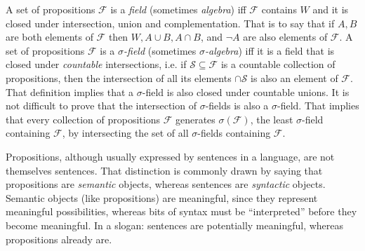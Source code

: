 A set of propositions $\mathcal{F}$ is a {\em field} (sometimes {\em algebra})
iff $\mathcal{F}$ contains $W$ and it is closed under intersection, union and
complementation. That is to say that if $A,B$ are both elements of $\mathcal{F}$
then $W,A\cup B,A\cap B$, and  $\neg A$ are also elements of $\mathcal{F}.$ A
set of propositions $\mathcal{F}$ is a {\em $\sigma$-field} (sometimes {\em
$\sigma$-algebra}) iff it is a field that is closed under {\em countable}
intersections, i.e. if $\mathcal{S}\subseteq \mathcal{F}$ is a countable
collection of propositions, then the intersection of all its elements $\cap
\mathcal{S}$ is also an element of $\mathcal{F}.$ That definition implies that a
$\sigma$-field is also closed under countable unions. It is not difficult to
prove that the intersection of $\sigma$-fields is also a $\sigma$-field. That
implies that every collection of propositions $\mathcal{F}$ generates
$\sigma(\mathcal{F})$, the least $\sigma$-field containing $\mathcal{F}$, by
intersecting the set of all $\sigma$-fields containing $\mathcal{F}$. 

Propositions, although usually expressed by sentences in a language, are not
themselves sentences. That distinction is commonly drawn by saying that
propositions are {\em semantic} objects, whereas sentences are {\em syntactic}
objects. Semantic objects (like propositions) are meaningful, since they
represent meaningful possibilities, whereas bits of syntax must be
``interpreted'' before they become meaningful. In a slogan: sentences are
potentially meaningful, whereas propositions already are.

